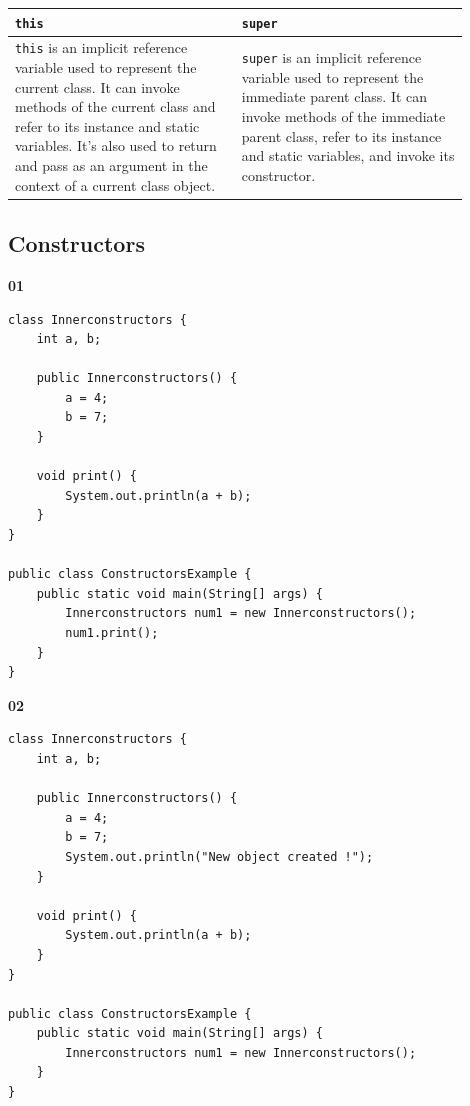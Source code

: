 \documentclass{book}
\begin{document}
\begin{center}
	\begin{tabular}{|p{0.45\linewidth}|p{0.45\linewidth}|}
		\hline
		\textbf{\texttt{this}}                                                                                                                                                                                                                                                     & \textbf{\texttt{super}}                                                                                                                                                                                                     \\
		\hline
		\texttt{this} is an implicit reference variable used to represent the current class. It can invoke methods of the current class and refer to its instance and static variables. It's also used to return and pass as an argument in the context of a current class object. & \texttt{super} is an implicit reference variable used to represent the immediate parent class. It can invoke methods of the immediate parent class, refer to its instance and static variables, and invoke its constructor. \\
		\hline
	\end{tabular}
\end{center}

\subsection{Constructors}

\textbf{01}
\begin{verbatim}
class Innerconstructors {
    int a, b;

    public Innerconstructors() {
        a = 4;
        b = 7;
    }

    void print() {
        System.out.println(a + b);
    }
}

public class ConstructorsExample {
    public static void main(String[] args) {
        Innerconstructors num1 = new Innerconstructors();
        num1.print();
    }
}
\end{verbatim}

\textbf{02}
\begin{verbatim}
class Innerconstructors {
    int a, b;

    public Innerconstructors() {
        a = 4;
        b = 7;
        System.out.println("New object created !");
    }

    void print() {
        System.out.println(a + b);
    }
}

public class ConstructorsExample {
    public static void main(String[] args) {
        Innerconstructors num1 = new Innerconstructors();
    }
}
\end{verbatim}
\end{document}
